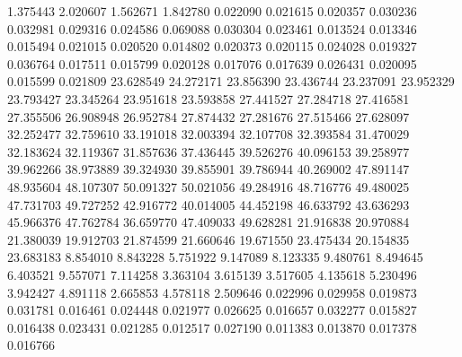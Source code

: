 1.375443
2.020607
1.562671
1.842780
0.022090
0.021615
0.020357
0.030236
0.032981
0.029316
0.024586
0.069088
0.030304
0.023461
0.013524
0.013346
0.015494
0.021015
0.020520
0.014802
0.020373
0.020115
0.024028
0.019327
0.036764
0.017511
0.015799
0.020128
0.017076
0.017639
0.026431
0.020095
0.015599
0.021809
23.628549
24.272171
23.856390
23.436744
23.237091
23.952329
23.793427
23.345264
23.951618
23.593858
27.441527
27.284718
27.416581
27.355506
26.908948
26.952784
27.874432
27.281676
27.515466
27.628097
32.252477
32.759610
33.191018
32.003394
32.107708
32.393584
31.470029
32.183624
32.119367
31.857636
37.436445
39.526276
40.096153
39.258977
39.962266
38.973889
39.324930
39.855901
39.786944
40.269002
47.891147
48.935604
48.107307
50.091327
50.021056
49.284916
48.716776
49.480025
47.731703
49.727252
42.916772
40.014005
44.452198
46.633792
43.636293
45.966376
47.762784
36.659770
47.409033
49.628281
21.916838
20.970884
21.380039
19.912703
21.874599
21.660646
19.671550
23.475434
20.154835
23.683183
8.854010
8.843228
5.751922
9.147089
8.123335
9.480761
8.494645
6.403521
9.557071
7.114258
3.363104
3.615139
3.517605
4.135618
5.230496
3.942427
4.891118
2.665853
4.578118
2.509646
0.022996
0.029958
0.019873
0.031781
0.016461
0.024448
0.021977
0.026625
0.016657
0.032277
0.015827
0.016438
0.023431
0.021285
0.012517
0.027190
0.011383
0.013870
0.017378
0.016766
